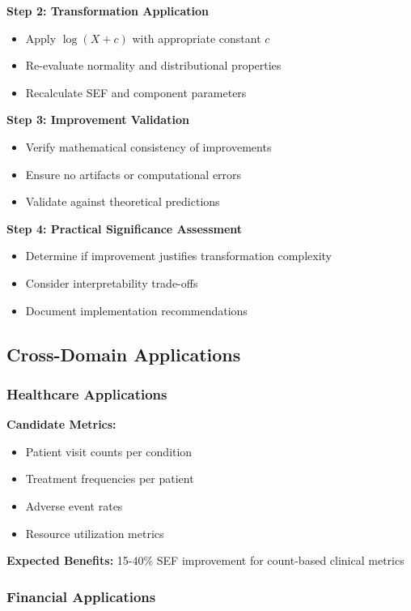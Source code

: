 \textbf{Step 2: Transformation Application}
\begin{itemize}
    \item Apply $\log(X + c)$ with appropriate constant $c$
    \item Re-evaluate normality and distributional properties
    \item Recalculate SEF and component parameters
\end{itemize}

\textbf{Step 3: Improvement Validation}
\begin{itemize}
    \item Verify mathematical consistency of improvements
    \item Ensure no artifacts or computational errors
    \item Validate against theoretical predictions
\end{itemize}

\textbf{Step 4: Practical Significance Assessment}
\begin{itemize}
    \item Determine if improvement justifies transformation complexity
    \item Consider interpretability trade-offs
    \item Document implementation recommendations
\end{itemize}

\subsection{Cross-Domain Applications}

\subsubsection{Healthcare Applications}

\textbf{Candidate Metrics:}
\begin{itemize}
    \item Patient visit counts per condition
    \item Treatment frequencies per patient
    \item Adverse event rates
    \item Resource utilization metrics
\end{itemize}

\textbf{Expected Benefits:} 15-40\% SEF improvement for count-based clinical metrics

\subsubsection{Financial Applications}

